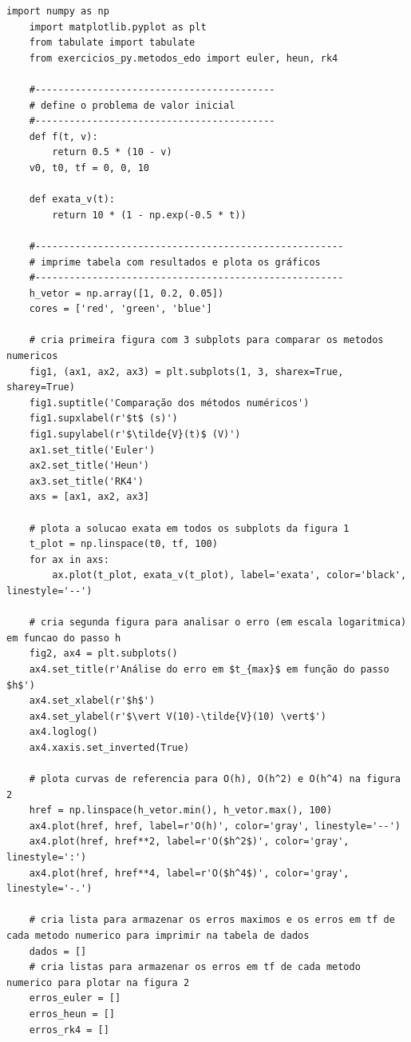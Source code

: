\documentclass[11pt]{article}
\begin{document}
\begin{lstlisting}[style=python-custom, caption={Resolução do PVI do circuito RC usando os métodos de Euler, Heun e RK4.}, label={lst:resolucao_edo}]
    import numpy as np
    import matplotlib.pyplot as plt
    from tabulate import tabulate
    from exercicios_py.metodos_edo import euler, heun, rk4

    #------------------------------------------
    # define o problema de valor inicial
    #------------------------------------------
    def f(t, v):
        return 0.5 * (10 - v)
    v0, t0, tf = 0, 0, 10

    def exata_v(t):
        return 10 * (1 - np.exp(-0.5 * t))

    #------------------------------------------------------
    # imprime tabela com resultados e plota os gráficos
    #------------------------------------------------------
    h_vetor = np.array([1, 0.2, 0.05])
    cores = ['red', 'green', 'blue']

    # cria primeira figura com 3 subplots para comparar os metodos numericos
    fig1, (ax1, ax2, ax3) = plt.subplots(1, 3, sharex=True, sharey=True)
    fig1.suptitle('Comparação dos métodos numéricos')
    fig1.supxlabel(r'$t$ (s)')
    fig1.supylabel(r'$\tilde{V}(t)$ (V)')
    ax1.set_title('Euler')
    ax2.set_title('Heun')
    ax3.set_title('RK4')
    axs = [ax1, ax2, ax3]

    # plota a solucao exata em todos os subplots da figura 1
    t_plot = np.linspace(t0, tf, 100)
    for ax in axs:
        ax.plot(t_plot, exata_v(t_plot), label='exata', color='black', linestyle='--')

    # cria segunda figura para analisar o erro (em escala logaritmica) em funcao do passo h
    fig2, ax4 = plt.subplots()
    ax4.set_title(r'Análise do erro em $t_{max}$ em função do passo $h$')
    ax4.set_xlabel(r'$h$')
    ax4.set_ylabel(r'$\vert V(10)-\tilde{V}(10) \vert$')
    ax4.loglog() 
    ax4.xaxis.set_inverted(True)

    # plota curvas de referencia para O(h), O(h^2) e O(h^4) na figura 2
    href = np.linspace(h_vetor.min(), h_vetor.max(), 100)
    ax4.plot(href, href, label=r'O(h)', color='gray', linestyle='--')
    ax4.plot(href, href**2, label=r'O($h^2$)', color='gray', linestyle=':')
    ax4.plot(href, href**4, label=r'O($h^4$)', color='gray', linestyle='-.')

    # cria lista para armazenar os erros maximos e os erros em tf de cada metodo numerico para imprimir na tabela de dados
    dados = []
    # cria listas para armazenar os erros em tf de cada metodo numerico para plotar na figura 2
    erros_euler = []
    erros_heun = []
    erros_rk4 = []


\end{lstlisting}
\end{document}
